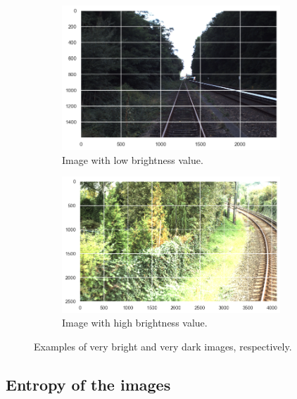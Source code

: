 \documentclass[Master,MDS,english]{BASE/twbook} %
\begin{document}
\begin{figure}[h]
\centering
\begin{subfigure}[t]{.5\textwidth}
  \centering
  \includegraphics[width=0.9\textwidth]{images/datasets/db/dark}
  \caption{Image with low brightness value.}
\end{subfigure}%
\begin{subfigure}[t]{.5\textwidth}
  \centering
  \includegraphics[width=0.9\textwidth]{images/datasets/db/bright}
  \caption{Image with high brightness value.}
\end{subfigure}
\caption{Examples of very bright and very dark images, respectively.}
\label{fig:brightness_examples}
\end{figure}



\subsection{Entropy of the images} \label{sec:entropy}
\end{document}
